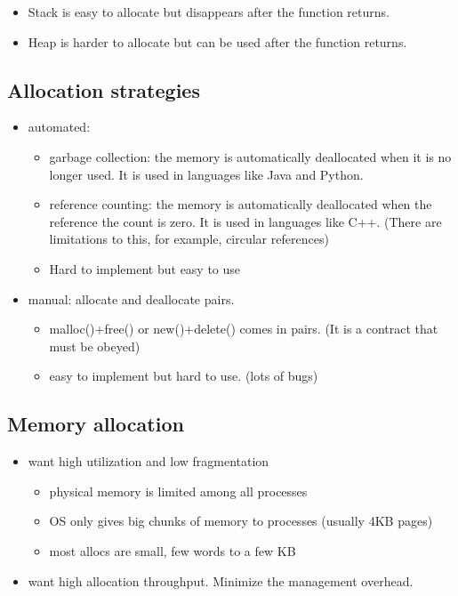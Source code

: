\documentclass[letterpaper,12pt]{article}
\begin{document}
\begin{itemize}
    \item Stack is easy to allocate but disappears after the function returns.
    \item Heap is harder to allocate but can be used after the function returns.
\end{itemize}

\subsection{Allocation strategies}
\begin{itemize}
    \item automated: \begin{itemize}
              \item garbage collection: the memory is automatically deallocated when it is no
                    longer used. It is used in languages like Java and Python.
              \item reference counting: the memory is automatically deallocated when the reference
                    the count is zero. It is used in languages like C++. (There are limitations to
                    this, for example, circular references)
              \item Hard to implement but easy to use
          \end{itemize}
    \item manual: allocate and deallocate pairs. \begin{itemize}
              \item malloc()+free() or new()+delete() comes in pairs. (It is a contract that must
                    be obeyed)
              \item easy to implement but hard to use. (lots of bugs)
          \end{itemize}
\end{itemize}
\subsection{Memory allocation}
\begin{itemize}
    \item want high utilization and low fragmentation\begin{itemize}
              \item physical memory is limited among all processes
              \item OS only gives big chunks of memory to processes (usually 4KB pages)
              \item most allocs are small, few words to a few KB
          \end{itemize}
    \item want high allocation throughput. Minimize the management overhead.
\end{itemize}
\end{document}
